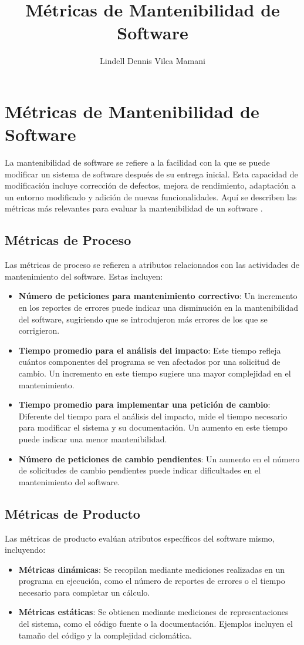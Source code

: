 \documentclass{article}
\title{Métricas de Mantenibilidad de Software}
\author{Lindell Dennis Vilca Mamani}
\date{ }
\begin{document}
\maketitle

\section{Métricas de Mantenibilidad de Software}
La mantenibilidad de software se refiere a la facilidad con la que se puede modificar un sistema de software después de su entrega inicial. Esta capacidad de modificación incluye corrección de defectos, mejora de rendimiento, adaptación a un entorno modificado y adición de nuevas funcionalidades. Aquí se describen las métricas más relevantes para evaluar la mantenibilidad de un software \cite{ingeniare2020}.

\subsection{Métricas de Proceso}
Las métricas de proceso se refieren a atributos relacionados con las actividades de mantenimiento del software. Estas incluyen:
\begin{itemize}
    \item \textbf{Número de peticiones para mantenimiento correctivo}: Un incremento en los reportes de errores puede indicar una disminución en la mantenibilidad del software, sugiriendo que se introdujeron más errores de los que se corrigieron.
    \item \textbf{Tiempo promedio para el análisis del impacto}: Este tiempo refleja cuántos componentes del programa se ven afectados por una solicitud de cambio. Un incremento en este tiempo sugiere una mayor complejidad en el mantenimiento.
    \item \textbf{Tiempo promedio para implementar una petición de cambio}: Diferente del tiempo para el análisis del impacto, mide el tiempo necesario para modificar el sistema y su documentación. Un aumento en este tiempo puede indicar una menor mantenibilidad.
    \item \textbf{Número de peticiones de cambio pendientes}: Un aumento en el número de solicitudes de cambio pendientes puede indicar dificultades en el mantenimiento del software.
\end{itemize}

\subsection{Métricas de Producto}
Las métricas de producto evalúan atributos específicos del software mismo, incluyendo:
\begin{itemize}
    \item \textbf{Métricas dinámicas}: Se recopilan mediante mediciones realizadas en un programa en ejecución, como el número de reportes de errores o el tiempo necesario para completar un cálculo.
    \item \textbf{Métricas estáticas}: Se obtienen mediante mediciones de representaciones del sistema, como el código fuente o la documentación. Ejemplos incluyen el tamaño del código y la complejidad ciclomática.
\end{itemize}
\end{document}

